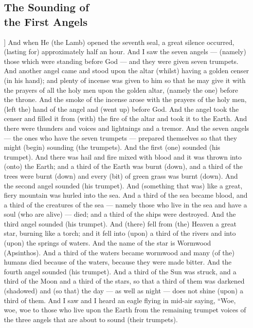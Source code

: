 \begin{pages}
\begin{Leftside}
        			\chapter{The Sounding of \\ the First Angels}
				]
		And when He (the Lamb) opened the seventh seal, a great silence occurred, (lasting for) approximately half an hour. And I saw the seven angels — (namely) those which were standing before God — and they were given seven trumpets. And another angel came and stood upon the altar (whilst) having a golden censer (in his hand); and plenty of incense was given to him so that he may give it with the prayers of all the holy men upon the golden altar, (namely the one) before the throne.
		\pend
		\pstart
		And the smoke of the incense arose with the prayers of the holy men, (left the) hand of the angel and (went up) before God. And the angel took the censer and filled it from (with) the fire of the altar and took it to the Earth. And there were thunders and voices and lightnings and a tremor. And the seven angels — the ones who have the seven trumpets — prepared themselves so that they might (begin) sounding (the trumpets). 
		\pend
		\pstart
		And the first (one) sounded (his trumpet). And there was hail and fire mixed with blood and it was thrown into (onto) the Earth; and a third of the Earth was burnt (down), and a third of the trees were burnt (down) and every (bit) of green grass was burnt (down).
		\pend
		\pstart
		And the second angel sounded (his trumpet). And (something that was) like a great, fiery mountain was hurled into the sea. And a third of the sea became blood, and a third of the creatures of the sea — namely those who live in the sea and have a soul (who are alive) — died; and a third of the ships were destroyed. 
		\pend
		\pstart
		And the third angel sounded (his trumpet). And (there) fell from (the) Heaven a great star, burning like a torch; and it fell into (upon) a third of the rivers and into (upon) the springs of waters. And the name of the star is Wormwood (Apsinthos). And a third of the waters became wormwood and many (of the) humans died because of the waters, because they were made bitter. 
		\pend
		\pstart
		And the fourth angel sounded (his trumpet). And a third of the Sun was struck, and a third of the Moon and a third of the stars, so that a third of them was darkened (shadowed) and (so that) the day — as well as night — does not shine (upon) a third of them. And I saw and I heard an eagle flying in mid-air saying, “Woe, woe, woe to those who live upon the Earth from the remaining trumpet voices of the three angels that are about to sound (their trumpets). 
		\pend
        \endnumbering
    \end{Leftside}

\end{pages} 
\Pages

